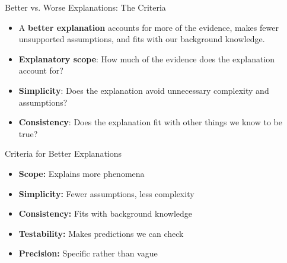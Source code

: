 \documentclass{beamer}
\begin{document}
\begin{frame}{Better vs. Worse Explanations: The Criteria}
	\begin{itemize}
		\item A \textbf{better explanation} accounts for more of the evidence, makes fewer unsupported assumptions, and fits with our background knowledge.
		\item \textbf{Explanatory scope}: How much of the evidence does the explanation account for?
		\item \textbf{Simplicity}: Does the explanation avoid unnecessary complexity and assumptions?
		\item \textbf{Consistency}: Does the explanation fit with other things we know to be true?
	\end{itemize}
	
	\begin{block}{Criteria for Better Explanations}
		\begin{itemize}
			\item \textbf{Scope:} Explains more phenomena
			\item \textbf{Simplicity:} Fewer assumptions, less complexity  
			\item \textbf{Consistency:} Fits with background knowledge
			\item \textbf{Testability:} Makes predictions we can check
			\item \textbf{Precision:} Specific rather than vague
		\end{itemize}
	\end{block}
\end{frame}
\end{document}
